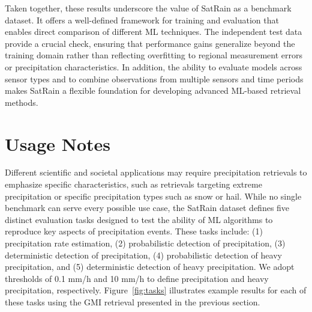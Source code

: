 \documentclass[11pt]{article}
\begin{document}
Taken together, these results underscore the value of SatRain as a benchmark
dataset. It offers a well-defined framework for training and evaluation that
enables direct comparison of different ML techniques. The independent test data
provide a crucial check, ensuring that performance gains generalize beyond the
training domain rather than reflecting overfitting to regional measurement
errors or precipitation characteristics. In addition, the ability to evaluate
models across sensor types and to combine observations from multiple sensors and
time periods makes SatRain a flexible foundation for developing advanced
ML-based retrieval methods.

\section{Usage Notes}

Different scientific and societal applications may require precipitation
retrievals to emphasize specific characteristics, such as retrievals targeting
extreme precipitation or specific precipitation types such as snow or hail.
While no single benchmark can serve every possible use case, the SatRain dataset
defines five distinct evaluation tasks designed to test the ability of ML
algorithms to reproduce key aspects of precipitation events. These tasks
include: (1) precipitation rate estimation, (2) probabilistic detection of
precipitation, (3) deterministic detection of precipitation, (4) probabilistic
detection of heavy precipitation, and (5) deterministic detection of heavy
precipitation. We adopt thresholds of 0.1 mm/h and 10 mm/h to define
precipitation and heavy precipitation, respectively.
Figure~\ref{fig:tasks} illustrates example results for each of these
tasks using the GMI retrieval presented in the previous section.
\end{document}
